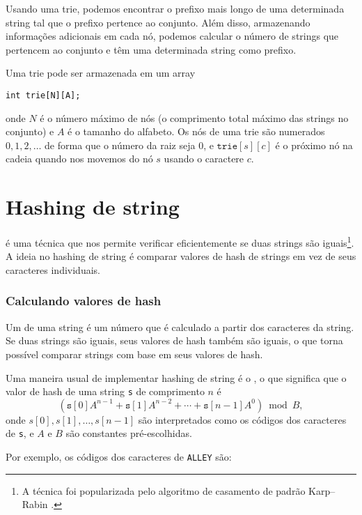 Usando uma trie, podemos encontrar o prefixo mais longo de uma determinada string tal que o prefixo pertence ao conjunto. Além disso, armazenando informações adicionais em cada nó, podemos calcular o número de strings que pertencem ao conjunto e têm uma determinada string como prefixo.

Uma trie pode ser armazenada em um array
\begin{lstlisting}
int trie[N][A];
\end{lstlisting}
onde $N$ é o número máximo de nós (o comprimento total máximo das strings no conjunto) e $A$ é o tamanho do alfabeto. Os nós de uma trie são numerados $0,1,2,\ldots$ de forma que o número da raiz seja 0, e $\texttt{trie}[s][c]$ é o próximo nó na cadeia quando nos movemos do nó $s$ usando o caractere $c$.

\section{Hashing de string}


 é uma técnica que nos permite verificar eficientemente se duas strings são iguais\footnote{A técnica foi popularizada pelo algoritmo de casamento de padrão Karp–Rabin \cite{kar87}.}. A ideia no hashing de string é comparar valores de hash de strings em vez de seus caracteres individuais.

\subsubsection*{Calculando valores de hash}


Um  de uma string é um número que é calculado a partir dos caracteres da string. Se duas strings são iguais, seus valores de hash também são iguais, o que torna possível comparar strings com base em seus valores de hash.

Uma maneira usual de implementar hashing de string é o , o que significa que o valor de hash de uma string \texttt{s} de comprimento $n$ é 
\[(\texttt{s}[0] A^{n-1} + \texttt{s}[1] A^{n-2} + \cdots + \texttt{s}[n-1] A^0) \bmod B  ,\]
onde $s[0],s[1],\ldots,s[n-1]$ são interpretados como os códigos dos caracteres de \texttt{s}, e $A$ e $B$ são constantes pré-escolhidas.

Por exemplo, os códigos dos caracteres de \texttt{ALLEY} são:
\begin{center}
\end{center}

